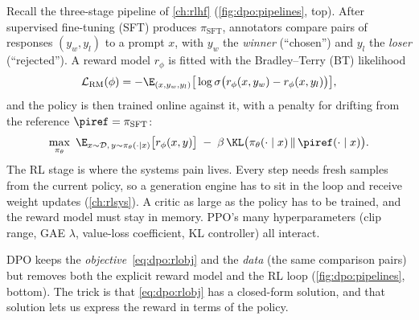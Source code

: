 Recall the three-stage pipeline of \cref{ch:rlhf} (\cref{fig:dpo:pipelines}, top). After
supervised fine-tuning (SFT) produces $\pi_{\text{SFT}}$, annotators compare pairs of responses
$(y_w, y_l)$ to a prompt $x$, with $y_w$ the \emph{winner} (``chosen'') and $y_l$ the \emph{loser}
(``rejected''). A reward model $r_\phi$ is fitted with the Bradley--Terry (BT) likelihood
\begin{equation}
\mathcal{L}_{\text{RM}}(\phi) = -\E_{(x,y_w,y_l)}\big[\log\sigma\big(r_\phi(x,y_w)-r_\phi(x,y_l)\big)\big],
\label{eq:dpo:bt}
\end{equation}
and the policy is then trained online against it, with a penalty for drifting from the reference
$\piref=\pi_{\text{SFT}}$:
\begin{equation}
\max_{\pi_\theta}\ \E_{x\sim\mathcal{D},\,y\sim\pi_\theta(\cdot\mid x)}\big[r_\phi(x,y)\big]
 \;-\;\beta\,\KL\big(\pi_\theta(\cdot\mid x)\,\|\,\piref(\cdot\mid x)\big).
\label{eq:dpo:rlobj}
\end{equation}
The RL stage is where the systems pain lives. Every step needs fresh samples from the current policy,
so a generation engine has to sit in the loop and receive weight updates (\cref{ch:rlsys}). A
critic as large as the policy has to be trained, and the reward model must stay in memory.
PPO's many hyperparameters (clip range, GAE $\lambda$, value-loss coefficient, KL
controller) all interact.

DPO keeps the \emph{objective}~\eqref{eq:dpo:rlobj} and the \emph{data} (the same comparison
pairs) but removes both the explicit reward model and the RL loop
(\cref{fig:dpo:pipelines}, bottom). The trick is that \eqref{eq:dpo:rlobj} has a closed-form
solution, and that solution lets us express the reward in terms of the policy.

